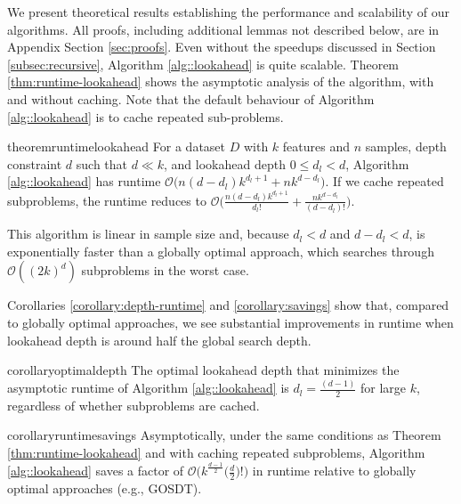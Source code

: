 
We present theoretical results establishing the performance and scalability of our algorithms. All proofs, including additional lemmas not described below, are in Appendix Section \ref{sec:proofs}.
Even without the speedups discussed in Section \ref{subsec:recursive}, Algorithm \ref{alg::lookahead} is quite scalable. Theorem \ref{thm:runtime-lookahead} shows the asymptotic analysis of the algorithm, with and without caching. Note that the default behaviour of Algorithm \ref{alg::lookahead} is to cache repeated sub-problems. 

\begin{restatable}{theorem}{runtimelookahead}
\label{thm:runtime-lookahead}
    For a dataset $D$ with $k$ features and $n$ samples, depth constraint $d$ such that $d \ll k$, and lookahead depth $0 \leq d_l < d$, Algorithm \ref{alg::lookahead} has runtime $\mathcal{O}\big(n(d-d_l)k^{d_l+1}+ nk^{d-d_l}\big)$. If we cache repeated subproblems, the runtime reduces to $\mathcal{O}\Big(\frac{n(d-d_l)k^{d_l+1}}{d_l!} + \frac{nk^{d - d_l}}{(d-d_l)!}\Big)$. 
\end{restatable}

This algorithm is linear in sample size and, because $d_l < d$ and $d - d_l < d$, is exponentially faster than a globally optimal approach, which searches through $\mathcal{O}((2k)^d)$ subproblems in the worst case. 

Corollaries \ref{corollary:depth-runtime} and \ref{corollary:savings} show that, compared to globally optimal approaches, we see substantial improvements in runtime when lookahead depth is around half the global search depth.

\begin{restatable}{corollary}{optimaldepth}
\label{corollary:depth-runtime}
The optimal lookahead depth that minimizes the asymptotic runtime of Algorithm \ref{alg::lookahead} is $d_l = \frac{(d-1)}{2}$ for large $k$, regardless of whether subproblems are cached. 
\end{restatable}

\begin{restatable}{corollary}{runtimesavings}
\label{corollary:savings}
Asymptotically, under the same conditions as Theorem \ref{thm:runtime-lookahead} and with caching repeated subproblems, Algorithm \ref{alg::lookahead} saves a factor of $\mathcal{O}\Big(k^{\frac{d-1}{2}}\Big(\frac{d}{2}\Big)!\Big)$ in runtime relative to globally optimal approaches (e.g., GOSDT).
\end{restatable}

